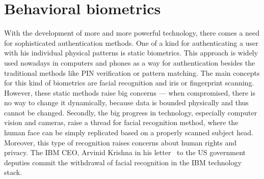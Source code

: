 \section{Behavioral biometrics}\label{sec:behavioral-biometrics}
With the development of more and more powerful technology, there comes a need for sophisticated authentication methods.
One of a kind for authenticating a user with his individual physical patterns is static biometrics.
This approach is widely used nowadays in computers and phones as a way for authentication besides the traditional methods like PIN verification or pattern matching.
The main concepts for this kind of biometrics are facial recognition and iris or fingerprint scanning.
However, these static methods raise big concerns --- when compromised, there is no way to change it dynamically, because data is bounded physically and thus cannot be changed.
Secondly, the big progress in technology, especially computer vision and cameras, raise a thread for facial recognition method, where the human face can be simply replicated based on a properly scanned subject head.
Moreover, this type of recognition raises concerns about human rights and privacy.
The IBM CEO, Arvinid Krishna in his letter~\cite{ibm_2020} to the US government deputies commit the withdrawal of facial recognition in the IBM technology stack.

